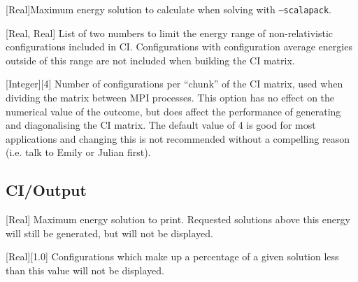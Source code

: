 \documentclass{report}
\begin{document}
[Real]{Maximum energy solution to calculate when solving with \texttt{--scalapack}.}

[Real, Real]{%
List of two numbers to limit the energy range of non-relativistic configurations included in CI.
Configurations with configuration average energies outside of this range are not included when building
the CI matrix.%
}

[Integer][4]{%
Number of configurations per ``chunk'' of the CI matrix, used when dividing the matrix between MPI
processes. This option has no effect on the numerical
value of the outcome, but does affect the performance of generating and diagonalising the CI matrix.
The default value of 4 is good for most applications and changing this is not recommended without a
compelling reason (i.e. talk to Emily or Julian first).%
}


\subsection{CI/Output}




[Real]{%
Maximum energy solution to print. Requested solutions above this energy will still be generated, but
will not be displayed.%
}

[Real][1.0]{%
Configurations which make up a percentage of a given solution less than this value will not be
displayed.%
}
\end{document}
